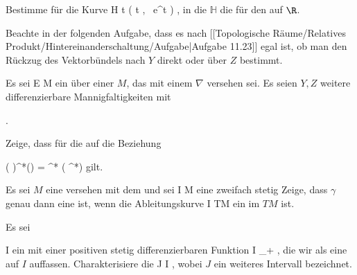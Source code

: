 {}
{

Bestimme für die Kurve
\maabbeledisp {\psi} {\R} { {\mathbb H}
} { t } { \left(  t   , \,  e^t                   \right)
} {,}
in die
${\mathbb H}$ die
für den
 {} {}
auf $\R$.

}
{} {}

Beachte in der folgenden Aufgabe, dass es nach
[[Topologische Räume/Relatives Produkt/Hintereinanderschaltung/Aufgabe|Aufgabe 11.23]]
egal ist, ob man den Rückzug des Vektorbündels nach $Y$ direkt oder über $Z$ bestimmt.

{}
{

Es sei
 { E } { M
} {}
ein
über einer
$M$, das mit einem
$\nabla$ versehen sei. Es seien $Y,Z$ weitere differenzierbare Mannigfaltigkeiten mit

 { . }

Zeige, dass für die
auf
 die Beziehung

\mavergleichskettedisp
{\vergleichskette
{ \left(  \psi \circ \varphi  \right)^*(\nabla)
}
{ =} { \varphi^*  \left(  \psi^*\nabla  \right)
}
{ } {
}
{ } {
}
{ } {
}
}
{}{}{}
gilt.

}
{} {}

{}
{

Es sei $M$ eine
versehen mit dem
und sei
\maabbdisp {\gamma} { I } { M
} {}
eine zweifach stetig
Zeige, dass $\gamma$ genau dann eine
ist, wenn die Ableitungskurve
 { I } { TM
} {}
ein
im
$TM$ ist.

}
{} {}

{}
{

Es sei

\mavergleichskette
{\vergleichskette
{ I
}
{ \subseteq }{ \R
}
{  }{
}
{    }{
}
{   }{
}
}
{}{}{}
ein
mit einer positiven stetig differenzierbaren Funktion
 { I } { \R_+
} {,}
die wir als eine
auf $I$ auffassen. Charakterisiere die
\maabbdisp {\gamma} { J } { I
} {,}
wobei $J$ ein weiteres Intervall bezeichnet.

}
{} {}

